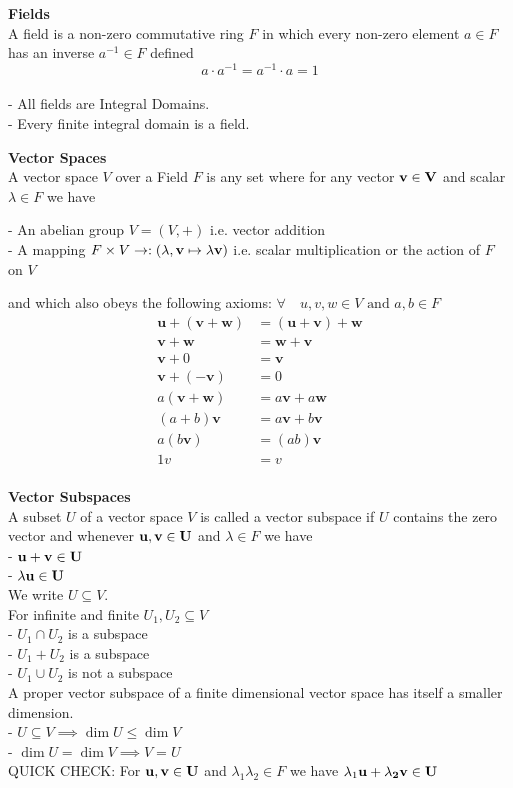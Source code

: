 \documentclass[a4paper, 10pt]{article}
\begin{document}
\begin{multicols*}{3}
\textbf{Fields}\\
A field is a non-zero commutative ring $F$ in which every non-zero element $a \in F$ has an inverse $a^{-1} \in F$ defined $$a \cdot a^{-1}=a^{-1} \cdot a=1$$\\
- All fields are Integral Domains. \\
- Every finite integral domain is a field.

\textbf{Vector Spaces}\\
A vector space $V$ over a Field $F$ is any set where for any vector $\bf{v}\in V$ and scalar $\lambda\in F$ we have

- An abelian group $V = (V, +)$ i.e. vector addition\\
- A mapping $F\times V \rightarrow : (\lambda, \bf{v}\mapsto \lambda\bf{v})$ i.e. scalar multiplication or the action of $F$ on $V$

and which also obeys the following axioms:
$\forall\quad u, v, w \in V \text{ and } a,b\in F$
\begin{align*}
\mathbf{u}+(\mathbf{v}+\mathbf{w}) &= (\mathbf{u}+\mathbf{v})+\mathbf{w} \\
\mathbf{v}+\mathbf{w} &= \mathbf{w}+\mathbf{v} \\
\mathbf{v}+0 &= \mathbf{v} \\
\mathbf{v}+(-\mathbf{v}) &= 0 \\
a(\mathbf{v}+\mathbf{w}) &= a \mathbf{v}+a \mathbf{w} \\
(a+b) \mathbf{v} &= a \mathbf{v}+b \mathbf{v} \\
a(b \mathbf{v}) &= (a b) \mathbf{v} \\
1 v &= v \\
\end{align*}

\textbf{Vector Subspaces}\\
A subset $U$ of a vector space $V$ is called a vector subspace if $U$ contains the zero vector and whenever $\bf{u}, \bf{v}\in U$ and $\lambda\in F$ we have \\
- $\bf{u} + \bf{v} \in U$\\
- $\lambda\bf{u}\in U$\\
We write $U\subseteq V$.\\
For infinite and finite $U_{1}, U_{2}\subseteq V$\\
- $U_{1}\cap U_{2}$  is a subspace\\
- $U_{1}+U_{2}$  is a subspace\\
- $U_{1}\cup U_{2}$  is not a subspace\\
A proper vector subspace of a finite dimensional vector space has itself a smaller dimension. \\
- $U\subseteq V \implies \dim U \leq \dim V$ \\
- $\dim U = \dim V \implies V=U$\\
QUICK CHECK: For  $\bf{u}, \bf{v}\in U$ and $\lambda_{1}\lambda_{2}\in F$ we have $\lambda_{1}\bf{u}+\lambda_{2}\bf{v}\in U$


\end{multicols*}
\end{document}
